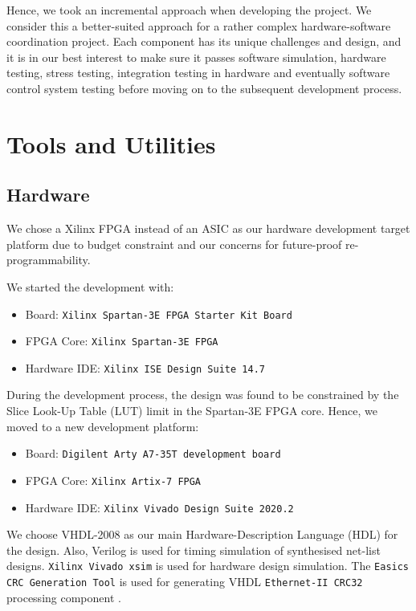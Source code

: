 \documentclass[a4paper]{report}
\newcommand{\proglang}{\textsf}
\newcommand{\code}{\texttt}
\begin{document}
Hence, we took an incremental approach when developing the project. We consider this a better-suited approach for a rather complex hardware-software coordination project. Each component has its unique challenges and design, and it is in our best interest to make sure it passes software simulation, hardware testing, stress testing, integration testing in hardware and eventually software control system testing before moving on to the subsequent development process.

\section{Tools and Utilities}

\subsection{Hardware}
\label{section:introduction-tools-hardware}

We chose a Xilinx FPGA instead of an ASIC as our hardware development target platform due to budget constraint and our concerns for future-proof re-programmability.

We started the development with:
\begin{itemize}
    \item Board: \code{Xilinx Spartan-3E FPGA Starter Kit Board} \cite{xilinx-documentation-2011}
    \item FPGA Core: \code{Xilinx Spartan-3E FPGA} \cite{xilinx-documentation-2011-core}
    \item Hardware IDE: \code{Xilinx ISE Design Suite 14.7} \cite{xilinx-documentation-ise}
\end{itemize}

During the development process, the design was found to be constrained by the Slice Look-Up Table (LUT) limit in the Spartan-3E FPGA core. Hence, we moved to a new development platform:
\begin{itemize}
    \item Board: \code{Digilent Arty A7-35T development board} \cite{digilent-arty}
    \item FPGA Core: \code{Xilinx Artix-7 FPGA} \cite{xilinx-documentation-artix}
    \item Hardware IDE: \code{Xilinx Vivado Design Suite 2020.2} \cite{xilinx-documentation-vivado}
\end{itemize}

We choose \proglang{VHDL-2008} \cite{ieee-vhdl} as our main Hardware-Description Language (HDL) for the design. Also, \proglang{Verilog} \cite{ieee-verilog} is used for timing simulation of synthesised net-list designs. \code{Xilinx Vivado xsim} \cite{xilinx-documentation-vivado} is used for hardware design simulation. The \code{Easics CRC Generation Tool} is used for generating \proglang{VHDL} \code{Ethernet-II CRC32} processing component \cite{easics-crc}.
\end{document}
